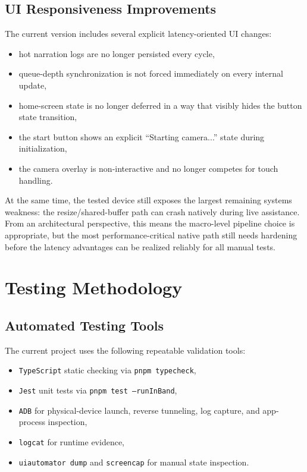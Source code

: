 \documentclass[conference]{IEEEtran}
\begin{document}
\subsection{UI Responsiveness Improvements}
The current version includes several explicit latency-oriented UI changes:
\begin{itemize}[leftmargin=1.2em]
\item hot narration logs are no longer persisted every cycle,
\item queue-depth synchronization is not forced immediately on every internal update,
\item home-screen state is no longer deferred in a way that visibly hides the button state transition,
\item the start button shows an explicit ``Starting camera...'' state during initialization,
\item the camera overlay is non-interactive and no longer competes for touch handling.
\end{itemize}

At the same time, the tested device still exposes the largest remaining systems weakness: the resize/shared-buffer path can crash natively during live assistance. From an architectural perspective, this means the macro-level pipeline choice is appropriate, but the most performance-critical native path still needs hardening before the latency advantages can be realized reliably for all manual tests.

\section{Testing Methodology}
\subsection{Automated Testing Tools}
The current project uses the following repeatable validation tools:
\begin{itemize}[leftmargin=1.2em]
\item \texttt{TypeScript} static checking via \texttt{pnpm typecheck},
\item \texttt{Jest} unit tests via \texttt{pnpm test --runInBand},
\item \texttt{ADB} for physical-device launch, reverse tunneling, log capture, and app-process inspection,
\item \texttt{logcat} for runtime evidence,
\item \texttt{uiautomator dump} and \texttt{screencap} for manual state inspection.
\end{itemize}
\end{document}
